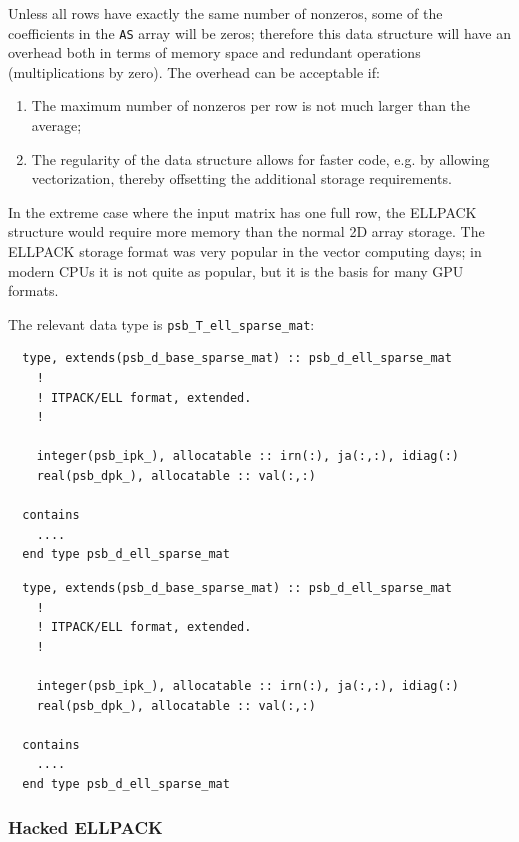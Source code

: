 Unless all rows have exactly the same number of nonzeros, some of the
coefficients in the \verb|AS| array will be zeros; therefore this
data structure will have  an overhead both in terms of memory space
and redundant operations (multiplications by zero).  The overhead can
be acceptable if: 
\begin{enumerate}
\item The maximum number of nonzeros per row is not much larger than
  the    average;
\item The regularity of the data structure allows for faster  code,
  e.g. by allowing vectorization, thereby offsetting the additional
  storage requirements.  
\end{enumerate}
In the extreme case where the input matrix has one full row, the
ELLPACK structure would require more memory than the normal 2D array
storage. The ELLPACK storage format was very popular in the vector
computing days; in modern CPUs it is not quite as popular, but it
is  the basis for many GPU formats. 

The relevant data type is \verb|psb_T_ell_sparse_mat|:
\ifpdf
\begin{verbatim}
  type, extends(psb_d_base_sparse_mat) :: psb_d_ell_sparse_mat
    !
    ! ITPACK/ELL format, extended.
    !     
    
    integer(psb_ipk_), allocatable :: irn(:), ja(:,:), idiag(:)
    real(psb_dpk_), allocatable :: val(:,:)

  contains
    ....
  end type psb_d_ell_sparse_mat
\end{verbatim}
\else
\begin{center}
    \begin{minipage}[tl]{0.9\textwidth}
\begin{verbatim} 
  type, extends(psb_d_base_sparse_mat) :: psb_d_ell_sparse_mat
    !
    ! ITPACK/ELL format, extended.
    !     
    
    integer(psb_ipk_), allocatable :: irn(:), ja(:,:), idiag(:)
    real(psb_dpk_), allocatable :: val(:,:)

  contains
    ....
  end type psb_d_ell_sparse_mat
\end{verbatim}
    \end{minipage}
  \end{center}
\fi


\subsubsection*{Hacked ELLPACK}

